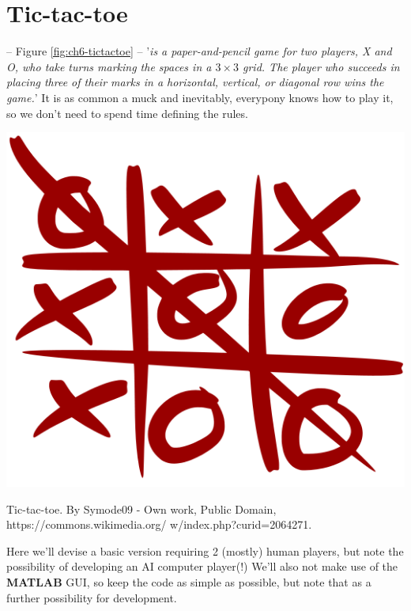 \documentclass{tufte-book} %
\begin{document}

\newpage


\section{Tic-tac-toe}

\vspace{-4mm}
 -- Figure \ref{fig:ch6-tictactoe} -- '\textit{is a paper-and-pencil game for two players, X and O, who take turns marking the spaces in a \(3\times3\) grid. The player who succeeds in placing three of their marks in a horizontal, vertical, or diagonal row wins the game.}' It is as common a muck and inevitably, everypony knows how to play it, so we don't need to spend time defining the rules.

\begin{marginfigure}[0.0in]
\includegraphics[width=\linewidth]{ch6-tictactoe.png}
\caption{Tic-tac-toe. By Symode09 - Own work, Public Domain, https://commons.wikimedia.org/
w/index.php?curid=2064271.}
\label{fig:ch6-tictactoe}
\end{marginfigure}

Here we'll devise a basic version requiring 2 (mostly) human players, but note the possibility of developing an AI computer player(!) We'll also  not make use of the \textbf{MATLAB} GUI, so keep the code as simple as possible, but note that as a further possibility for development.
\end{document}
